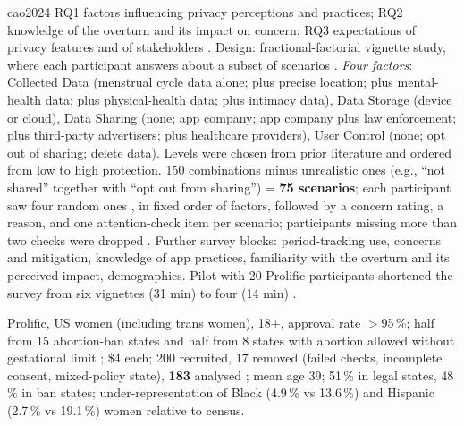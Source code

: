 \begin{papercard}{cao2024}
 RQ1 factors influencing privacy perceptions and practices; RQ2 knowledge of the overturn and its impact on concern; RQ3 expectations of privacy features and of stakeholders . Design: fractional-factorial vignette study, where each participant answers about a subset of scenarios . \emph{Four factors}: Collected Data (menstrual cycle data alone; plus precise location; plus mental-health data; plus physical-health data; plus intimacy data), Data Storage (device or cloud), Data Sharing (none; app company; app company plus law enforcement; plus third-party advertisers; plus healthcare providers), User Control (none; opt out of sharing; delete data). Levels were chosen from prior literature and ordered from low to high protection. 150 combinations minus unrealistic ones (e.g., ``not shared'' together with ``opt out from sharing'') = \textbf{75 scenarios}; each participant saw four random ones , in fixed order of factors, followed by a concern rating, a reason, and one attention-check item per scenario; participants missing more than two checks were dropped . Further survey blocks: period-tracking use, concerns and mitigation, knowledge of app practices, familiarity with the overturn and its perceived impact, demographics. Pilot with 20 Prolific participants shortened the survey from six vignettes (31 min) to four (14 min) .

 Prolific, US women (including trans women), 18+, approval rate $>$95\,\%; half from 15 abortion-ban states and half from 8 states with abortion allowed without gestational limit ; \$4 each; 200 recruited, 17 removed (failed checks, incomplete consent, mixed-policy state), \textbf{183} analysed ; mean age 39; 51\,\% in legal states, 48\,\% in ban states; under-representation of Black (4.9\,\% vs 13.6\,\%) and Hispanic (2.7\,\% vs 19.1\,\%) women relative to census.


\end{papercard}
